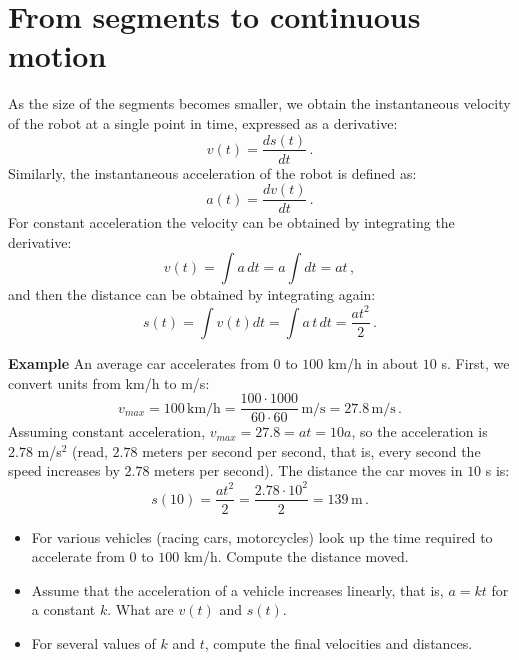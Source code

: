 \section{From segments to continuous motion}\label{s.continuous}

As the size of the segments becomes smaller, we obtain the instantaneous velocity of the robot at a single point in time, expressed as a derivative:
\[v(t) = \frac{ds(t)}{dt}\,.\]
Similarly, the instantaneous acceleration of the robot is defined as:
\[a(t) = \frac{dv(t)}{dt}\,.\]
For constant acceleration the velocity can be obtained by integrating the derivative:
\[v(t) = \int a\, dt = a\int {dt} = at\,,\]
and then the distance can be obtained by integrating again:
\[s(t) = \int v(t) dt=\int a\,t\,dt = \frac{at^2}{2}\,.\]

\noindent{}\textbf{Example} An average car accelerates from $0$ to $100$ km/h in about $10$ s. First, we convert units from km/h to m/s:
\[
v_{\textit{max}} = 100\, \textrm{km/h} = \frac{100\cdot 1000}{60\cdot 60} \,\textrm{m/s} = 27.8 \,\textrm{m/s}\,.
\]
Assuming constant acceleration, $v_{\textit{max}} = 27.8 = at = 10a$, so the acceleration is $2.78$ m/s$^{2}$ (read, $2.78$ meters per second per second, that is, every second the speed increases by $2.78$ meters per second). The distance the car moves in $10$ s is:
\[s(10) = \frac{at^2}{2} = \frac{2.78\cdot 10^2}{2}= 139 \,\textrm{m}\,.\]

\begin{framed}

\begin{itemize}
\item For various vehicles (racing cars, motorcycles) look up the time required to accelerate from $0$ to $100$ km/h. Compute the distance moved.
\item Assume that the acceleration of a vehicle increases linearly, that is, $a=kt$ for a constant $k$. What are $v(t)$ and $s(t)$.
\item For several values of $k$ and $t$, compute the final velocities and distances.
\end{itemize}
\end{framed}

